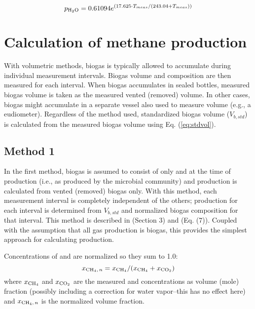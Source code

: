 \documentclass[]{article}
\begin{document}
\begin{equation}
\label{eq:magnus}
   p\textsubscript{H$_2$O} = 0.61094 e^{(17.625 \cdot T_{meas}/(243.04 + T_{meas}))}
\end{equation}

\section{Calculation of methane production}

With volumetric methods, biogas is typically allowed to accumulate during individual measurement intervals.
Biogas volume and composition are then measured for each interval.
When biogas accumulates in sealed bottles, measured biogas volume is taken as the measured vented (removed) volume.
In other cases, biogas might accumulate in a separate vessel also used to measure volume (e.g., a eudiometer).
Regardless of the method used, standardized biogas volume ($V_{b, std}$) is calculated from the measured biogas volume using Eq. (\ref{eq:stdvol}).

\subsection{Method 1}
In the first method, biogas is assumed to consist of only  and  at the time of production (i.e., as produced by the microbial community) and  production is calculated from vented (removed) biogas only.
With this method, each measurement interval is completely independent of the others;  production for each interval is determined from $V_{b, std}$ and normalized biogas composition for that interval.
This method is described in \citet{richardsMethodsKineticanalysisMethane1991} (Section 3) and \citet{vdiFermentationOrganicMaterials2016} (Eq. (7)).
Coupled with the assumption that all gas production is biogas, this provides the simplest approach for calculating  production.

Concentrations of  and  are normalized so they sum to 1.0:
\begin{equation}
  x\textsubscript{CH$_4$$, n$} = x\textsubscript{CH$_4$}/(x\textsubscript{CH$_4$} + x\textsubscript{CO$_2$})
\end{equation}
where $x\textsubscript{CH$_4$}$ and $x\textsubscript{CO$_2$}$ are the measured  and  concentrations as volume (mole) fraction (possibly including a correction for water vapor--this has no effect here) and $x\textsubscript{CH$_4$$, n$}$ is the normalized  volume fraction.
\end{document}
